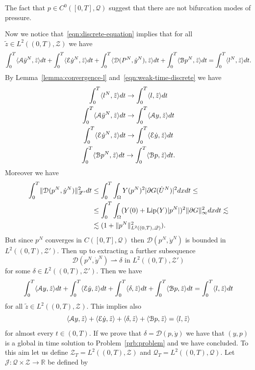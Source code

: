 \begin{rmk}
The fact that $p\in C^0([0,T],\mathscr{Q})$ suggest that there are not bifurcation modes of pressure.
\end{rmk}
Now we notice that~\eqref{eqn:discrete-equation} implies that for all $\tilde z\in L^2((0,T),\mathscr{Z})$ we have
\[
\int_0^T\langle\mathcal{A}\bar y^N,\tilde z\rangle dt+\int_0^T\langle\mathcal{E}\dot y^N,\tilde z\rangle dt+\int_0^T\langle\mathcal{D}(P^N,\dot y^N),\tilde z\rangle dt+\int_0^T\langle\mathcal{B}p^N,\tilde z\rangle dt=\int_0^T\langle l^N,\tilde z\rangle dt.
\]
By Lemma~\ref{lemma:convergence-l} and~\eqref{eqn:weak-time-discrete} we have
\begin{gather*}
\int_0^T\langle l^N,\tilde z\rangle dt\to\int_0^T\langle l,\tilde z\rangle dt \\
\int_0^T\langle\mathcal{A}\bar y^N,\tilde z\rangle dt\to\int_0^T\langle\mathcal{A}y,\tilde z\rangle dt \\
\int_0^T\langle\mathcal{E}\dot y^N,\tilde z\rangle dt\to\int_0^T\langle\mathcal{E}\dot y,\tilde z\rangle dt \\
\int_0^T\langle\mathcal{B}p^N,\tilde z\rangle dt\to\int_0^T\langle\mathcal{B}p,\tilde z\rangle dt.
\end{gather*}
Moreover we have
\[
\begin{split}
\int_0^T\lVert\mathcal{D}(p^N,\dot y^N)\rVert_{\mathscr{Z}'}^2dt&\le\int_0^T\int_\Omega Y(p^N)^2|\partial G(\dot U^N)|^2dxdt\le\\
&\le\int_0^T\int_\Omega(Y(0)+\text{Lip}(Y)|p^N|)^2\lVert\partial G\rVert_\infty^2dxdt\lesssim\\
&\lesssim(1+\lVert p^N\rVert_{L^2((0,T),\mathscr{Q})}^2).
\end{split}
\]
But since $p^N$ converges in $C([0,T],\mathscr{Q})$ then $\mathcal{D}(p^N,\dot y^N)$ is bounded in $L^2((0,T),\mathscr{Z}')$. Then up to extracting a further subsequence
\[
\mathcal{D}(p^N,\dot y^N)\rightharpoonup\delta\text{ in $L^2((0,T),\mathscr{Z}')$}
\]
for some $\delta\in L^2((0,T),\mathscr{Z}')$. Then we have
\begin{equation}
\label{eqn:quasi}
\int_0^T\langle\mathcal{A}y,\tilde z\rangle dt+\int_0^T\langle\mathcal{E}\dot y,\tilde z\rangle dt+\int_0^T\langle\delta,\tilde z\rangle dt+\int_0^T\langle\mathcal{B}p,\tilde z\rangle dt=\int_0^T\langle l,\tilde z\rangle dt
\end{equation}
for all $\tilde z\in L^2((0,T),\mathscr{Z})$. This implies also
\[
\langle\mathcal{A}y,\tilde z\rangle+\langle\mathcal{E}\dot y,\tilde z\rangle+\langle\delta,\tilde z\rangle+\langle\mathcal{B}p,\tilde z\rangle=\langle l,\tilde z\rangle
\]
for almost every $t\in(0,T)$. If we prove that $\delta=\mathcal{D}(p,\dot y)$ we have that $(y,p)$ is a global in time solution to Problem~\ref{prb:problem} and we have concluded. To this aim let us define $\mathscr{Z}_T=L^2((0,T),\mathscr{Z})$ and $\mathscr{Q}_T=L^2((0,T),\mathscr{Q})$. Let $\mathcal{J}\colon\mathscr{Q}\times\mathscr{Z}\to\mathbb{R}$ be defined by
